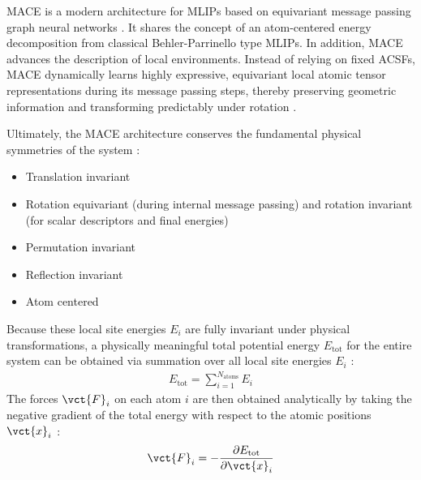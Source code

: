 MACE is a modern architecture for MLIPs based on equivariant message passing graph neural networks \cite{batatia2024foundation}. 
It shares the concept of an atom-centered energy decomposition from classical Behler-Parrinello type MLIPs.
In addition, MACE advances the description of local environments.
Instead of relying on fixed ACSFs, MACE dynamically learns highly expressive, equivariant local atomic tensor representations during its message passing steps, thereby preserving geometric information and transforming predictably under rotation \cite{batatia2024foundation}\cite{Jacobs2025}.

Ultimately, the MACE architecture conserves the fundamental physical symmetries of the system \cite{Drautz2019}\cite{Jacobs2025}\cite{batatia2024foundation}:
\begin{itemize}
    \item Translation invariant
    \item Rotation equivariant (during internal message passing) and rotation invariant (for scalar descriptors and final energies)
    \item Permutation invariant 
    \item Reflection invariant
    \item Atom centered
\end{itemize}

Because these local site energies $E_i$ are fully invariant under physical transformations, a physically meaningful total potential energy $E_{\text{tot}}$ for the entire system can be obtained via summation over all local site energies $E_i$ \cite{batatia2024foundation}:
\begin{align}
    E_{\text{tot}} = \sum_{i=1}^{N_{\text{atoms}}} E_i
\end{align}
The forces $\vct{F}_i$ on each atom $i$ are then obtained analytically by taking the negative gradient of the total energy with respect to the atomic positions $\vct{x}_i$ \cite{Jacobs2025}\cite{Schaefer2025}:
\begin{align}
    \vct{F}_i = -\frac{\partial E_{\text{tot}}}{\partial \vct{x}_i}
\end{align}

